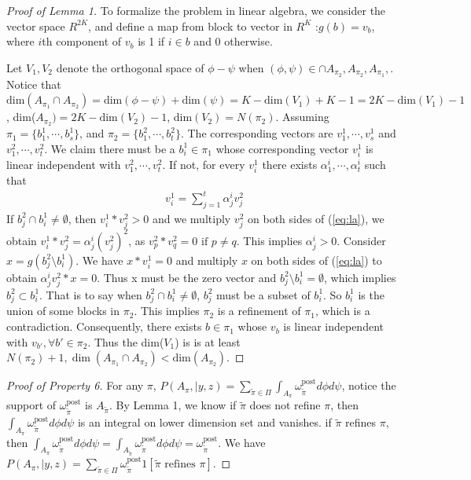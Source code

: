 \documentclass[aoas,preprint]{imsart}
\begin{document}
\begin{proof}[Proof of Lemma 1]
To formalize the problem in linear algebra, 
we consider the vector space $R^{2K}$, and define a map from block to vector in $R^K$ :$g(b) = v_b$, where $i$th component of $v_b$ is 1 if $i \in b$ and 0 otherwise.

Let $V_1, V_2$ denote the orthogonal space of $\phi - \psi$ when $(\phi,\psi)\in  \cap A_{\pi_2}, A_{\pi_2}, A_{\pi_1},$. Notice that $\text{dim}(A_{\pi_1} \cap A_{\pi_2}) = \text{dim}(\phi - \psi) + \text{dim}(\psi) = K - \text{dim}(V_1)  + K- 1=  2K -  \text{dim}(V_1)  -1$, dim($A_{\pi_2}) = 2K - \text{dim}(V_2) - 1$, dim$(V_2) = N(\pi_2)$.
Assuming $\pi_1 = \{b_1^1,\cdots,b_s^1\}$, and  $\pi_2 = \{b_1^2,\cdots,b_t^2\}$. 
The corresponding vectors are $v_1^1,\cdots,v_s^1$ and $v_1^2,\cdots,v_t^2$. 
We claim there must be a $b_i^1\in \pi_1$ whose corresponding vector $v_i^1$ is linear independent 
with $v_1^2,\cdots,v_t^2$. If not, for every $v_i^1$ there exists $\alpha_1^i,\cdots,\alpha_t^i$ 
such that 
\begin{eqnarray}
\label{eq:la}
v_i^1 = \sum_{j = 1}^t \alpha_j^i v_j^2 
\end{eqnarray}
If $b_j^2 \cap b_i^1 \neq \emptyset$, then $v_i^1 * v_j^2 > 0$ and we multiply $v_j^2$ on both sides of 
(\ref{eq:la}), we obtain $v_i^1 * v_j^2 = \alpha_j^i (v_j^2)^2$, as $v_p^2 * v_q^2 = 0 \text{ if } p\neq q$. This implies $\alpha_j^i > 0$. Consider $x = g(b_j^2\setminus b_i^1)$. We have $x*v_i^1 = 0$ and multiply $x$ on both sides of (\ref{eq:la}) to obtain $\alpha_j^i v_j^2*x = 0$. Thus x must be the zero vector and $b_j^2\setminus b_i^1= \emptyset$, which implies $b_j^2 \subset b_i^1$. That is to say when $b_j^2 \cap b_i^1 \neq \emptyset$, $b_j^2$ must 
be  a subset of $b_i^1$. So $b_i^1$ is the union of some blocks in $\pi_2$.  
 This implies $\pi_2$ is a refinement of $\pi_1$, which is  a contradiction.
Consequently, there exists $b\in\pi_1$ whose $v_b$ is linear independent with $v_{b'}, \forall b'\in\pi_2$. Thus the dim($V_1$) is is at least $N(\pi_2) + 1, \dim(A_{\pi_1} \cap A_{\pi_2}) < \text{dim}(A_{\pi_2})$.
\end{proof}

\begin{proof}[Proof of Property 6]
For any $\pi$, $P(A_\pi, | y, z) = \underset{\tilde \pi \in \Pi}{\sum} \int_{A_{\pi}} \omega_{\tilde \pi}^{\text{post}} d\phi d\psi$, 
notice the support of $\omega_{\tilde \pi}^{\text{post}}$ is $A_{\tilde \pi}$. 
By Lemma 1, we know if $\tilde \pi$ does not refine $\pi$, then $\int_{A_{\pi}} \omega_{\tilde \pi}^{\text{post}} d\phi d\psi$ is an integral on lower dimension set and vanishes. if $\tilde \pi$ refines $\pi$, then 
$\int_{A_{\pi}} \omega_{\tilde \pi}^{\text{post}} d\phi d\psi = \int_{A_{\tilde \pi}} \omega_{\tilde \pi}^{\text{post}} d\phi d\psi = \omega_{\tilde \pi}^{\text{post}}$. We have $P(A_\pi, | y, z) = \underset{\tilde \pi \in \Pi}{\sum} \omega_{\tilde \pi}^{\text{post}} 1[\tilde \pi \text{ refines } \pi ]$.
\end{proof}
\end{document}
